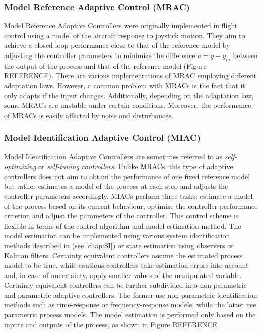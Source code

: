 \documentclass[9pt, twoside]{article}
\begin{document}
\begin{multicols}{2}
\subsubsection{Model Reference Adaptive Control (MRAC)}
Model Reference Adaptive Controllers were originally implemented in flight control using a model of the aircraft response to joystick motion.\cite{aastrom2013adaptive} They aim to achieve a closed loop performance close to that of the reference model by adjusting the controller parameters to minimize the difference $e=y-y_{m}$ between the output of the process and that of the reference model (Figure REFERENCE). There are various implementations of MRAC employing different adaptation laws. However, a common problem with MRACs is the fact that it only adapts if the input changes. Additionally, depending on the adaptation law, some MRACs are unstable under certain conditions. Moreover, the performance of MRACs is easily affected by noise and disturbances.
\subsubsection{Model Identification Adaptive Control (MIAC)}
Model Identification Adaptive Controllers are sometimes referred to as \textit{self-optimizing} or \textit{self-tuning controllers}. Unlike MRACs, this type of adaptive controllers does not aim to obtain the performance of one fixed reference model but rather estimates a model of the process at each step and adjusts the controller parameters accordingly. MIACs perform three tasks: estimate a model of the process based on its current behaviour, optimize the controller performance criterion and adjust the parameters of the controller. This control scheme is flexible in terms of the control algorithm and model estimation method. The model estimation can be implemented using various system identification methods described in (see \autoref{chap:SI}) or state estimation using observers or Kalman filters. Certainty equivalent controllers assume the estimated process model to be true, while cautious controllers take estimation errors into account and, in case of uncertainty, apply smaller values of the manipulated variable. Certainty equivalent controllers can be further subdivided into non-parametric and parametric adaptive controllers. The former use non-parametric identification methods such as time-response or frequency-response models, while the latter use parametric process models. The model estimation is performed only based on the inputs and outputs of the process, as shown in Figure REFERENCE.


\end{multicols}
\end{document}
